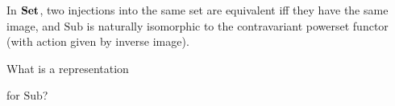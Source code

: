 \begin{example}
In $\mathbf {Set}$, two injections into the same set are equivalent iff they have
the same image, and $\mathrm{Sub}$ is naturally isomorphic to the
contravariant powerset functor (with action given by inverse image).
\end{example}

\begin{exercise}
What is a representation 
\begin{center}
\end{center}	
for $\mathrm{Sub}$?
\end{exercise}
 
